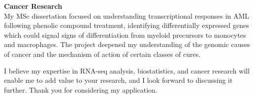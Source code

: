 \documentclass{resume}
\begin{document}
\begin{rSection}{}
\textbf{Cancer Research} \\
My MSc dissertation focused on understanding transcriptional responses in AML following phenolic compound treatment, identifying differentially expressed genes which could signal signs of differentiation from myeloid precursors to monocytes and macrophages. The project deepened my understanding of the genomic causes of cancer and the mechanism of action of certain classes of cures.

I believe my expertise in RNA-seq analysis, biostatistics, and cancer research will enable me to add value to your research, and I look forward to discussing it further. Thank you for considering my application.

\end{rSection}
\end{document}

